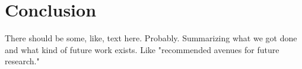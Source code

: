 \chapter{Conclusion}
There should be some, like, text here.
Probably.
Summarizing what we got done and what kind of future work exists.
Like "recommended avenues for future research."
